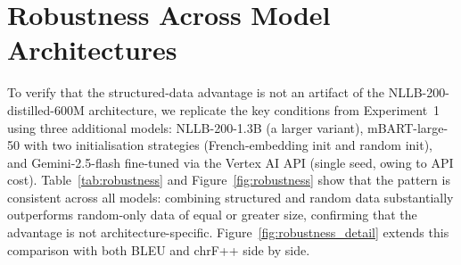 \documentclass[11pt]{article}
\begin{document}


%


\appendix

\section{Robustness Across Model Architectures}
\label{sec:appendix_robustness}

To verify that the structured-data advantage is not an artifact of the NLLB-200-distilled-600M
architecture, we replicate the key conditions from Experiment~1 using three additional models:
NLLB-200-1.3B (a larger variant), mBART-large-50 \citep{liu-etal-2020-multilingual-denoising}
with two initialisation strategies (French-embedding init and random init), and Gemini-2.5-flash
\citep{team2024gemini} fine-tuned via the Vertex AI API (single seed, owing to API cost).
Table~\ref{tab:robustness} and Figure~\ref{fig:robustness} show that the pattern is consistent
across all models: combining structured and random data substantially outperforms
random-only data of equal or greater size, confirming that the advantage is not architecture-specific.
Figure~\ref{fig:robustness_detail} extends this comparison with both BLEU and chrF++ side by side.
\end{document}
